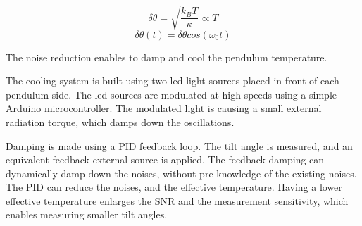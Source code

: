 \documentclass[\main/master.tex]{subfiles}
\begin{document}
\begin{equation}
\delta\theta = \sqrt{\frac{k_BT}{\kappa}}\propto{T}  \label{eqn:radiation force}
\end{equation}
\begin{equation}
\delta\theta(t) = \delta\theta cos(\omega_0 t)   \label{eqn:pid_error}
\end{equation}
\par\noindent
The noise reduction enables to damp and cool the pendulum temperature. 
\par\noindent
The cooling system is built using two led light sources placed in front of each pendulum side. The led sources are modulated at high speeds using a simple Arduino microcontroller. The modulated light is causing a small external radiation torque, which damps down the oscillations.
\par\noindent
Damping is made using a PID feedback loop. The tilt angle is measured, and an equivalent feedback external source is applied. The feedback damping can dynamically damp down the noises, without pre-knowledge of the existing noises. The PID can reduce the noises, and the effective temperature. Having a lower effective temperature enlarges the SNR and the measurement sensitivity, which enables measuring smaller tilt angles.
\end{document}
